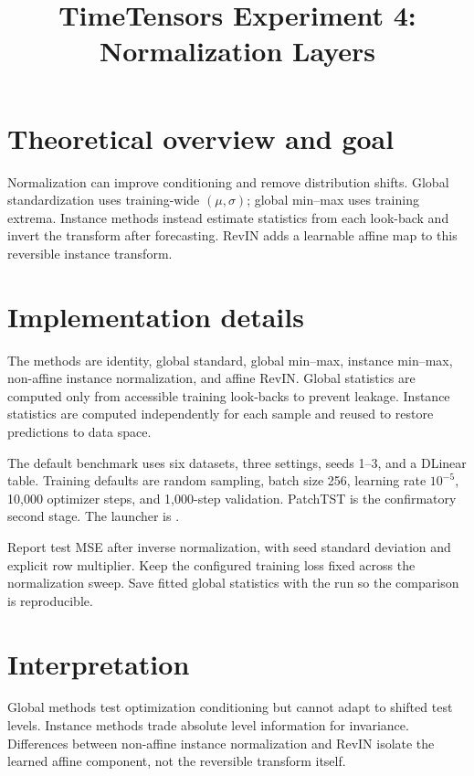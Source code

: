 \documentclass[10pt]{article}
\title{TimeTensors Experiment 4: Normalization Layers}
\author{}
\date{}
\begin{document}
\maketitle
\section{Theoretical overview and goal}
Normalization can improve conditioning and remove distribution shifts.  Global
standardization uses training-wide $(\mu,\sigma)$; global min--max uses training
extrema.  Instance methods instead estimate statistics from each look-back and
invert the transform after forecasting.  RevIN adds a learnable affine map to
this reversible instance transform.


\section{Implementation details}
The methods are identity, global standard, global min--max, instance min--max,
non-affine instance normalization, and affine RevIN.  Global statistics are
computed only from accessible training look-backs to prevent leakage.  Instance
statistics are computed independently for each sample and reused to restore
predictions to data space.

The default benchmark uses six datasets, three settings, seeds 1--3, and a
DLinear table. Training defaults are random sampling, batch size 256, learning
rate $10^{-5}$, 10,000 optimizer steps, and 1,000-step validation. PatchTST is
the confirmatory second stage. The launcher is
.

Report test MSE after inverse normalization, with seed standard deviation and
explicit row multiplier.  Keep the configured training loss fixed across the
normalization sweep.  Save fitted global statistics with the run so the
comparison is reproducible.

\section{Interpretation}
Global methods test optimization conditioning but cannot adapt to shifted test
levels.  Instance methods trade absolute level information for invariance.
Differences between non-affine instance normalization and RevIN isolate the
learned affine component, not the reversible transform itself.
\end{document}
